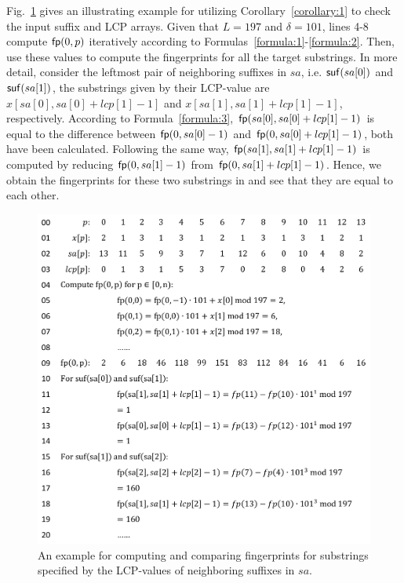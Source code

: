 \documentclass[10pt,journal,compsoc]{IEEEtran}
\begin{document}
Fig.~\ref{fig:example} gives an illustrating example for utilizing Corollary~\ref{corollary:1} to check the input suffix and LCP arrays. Given that $L = 197$ and $\delta = 101$, lines 4-8 compute ${\sf fp}(0, p)$ iteratively according to Formulas~\ref{formula:1}-\ref{formula:2}. Then, {\color{red}{lines 10-20}} use these values to compute the fingerprints for all the target substrings. In more detail, consider the leftmost pair of neighboring suffixes in $sa$, i.e. ${\sf suf}(sa[0])$ and ${\sf suf}(sa[1])$, the substrings given by their LCP-value are $x[sa[0], sa[0] + lcp[1] - 1]$ and $x[sa[1], sa[1] + lcp[1] - 1]$, respectively. According to Formula~\ref{formula:3}, ${\sf fp}(sa[0], sa[0] + lcp[1] - 1)$ is equal to the difference between ${\sf fp}(0, sa[0] - 1)$ and ${\sf fp}(0, sa[0] + lcp[1] - 1)$, both have been calculated. Following the same way, ${\sf fp}(sa[1], sa[1] + lcp[1] - 1)$ is computed by reducing ${\sf fp}(0, sa[1] - 1)$ from ${\sf fp}(0, sa[1] + lcp[1] - 1)$. Hence, we obtain the fingerprints for these two substrings in {\color{red}{lines 10-14}} and see that they are equal to each other.

\begin{figure}
	\centering
	
	\includegraphics[width = 0.9\columnwidth]{example}
	\caption{An example for computing and comparing fingerprints for substrings specified by the LCP-values of neighboring suffixes in $sa$. \label{fig:example}}	
\end{figure}
\end{document}
